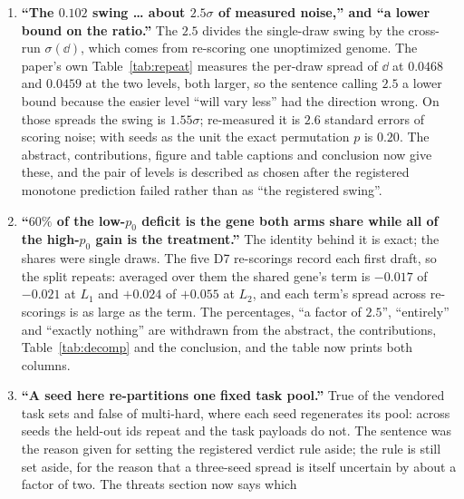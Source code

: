\documentclass[11pt]{article}
\begin{document}
\begin{enumerate}
    the critique gene and, in the quoted mechanism statement, the verifier gene for
    \texttt{ensure\_correct}, and the generation gene for \texttt{generate}. The companion on
    the silent no-op had already recorded this omission for the \texttt{actuator} and fixed it
    for that one gene; the class it belonged to was not swept, so four more names kept the same
    gap. The shared harness note now declares all of them, and a census fails on the next bare
    name nobody has ruled on.
  \item \textbf{``The $0.102$ swing \dots{} about $2.5\sigma$ of measured noise,'' and ``a lower
    bound on the ratio.''} The $2.5$ divides the single-draw swing by the cross-run $\sigma(\dd)$,
    which comes from re-scoring one unoptimized genome. The paper's own Table~\ref{tab:repeat}
    measures the per-draw spread of $\dd$ at $0.0468$ and $0.0459$ at the two levels, both larger,
    so the sentence calling $2.5$ a lower bound because the easier level ``will vary less'' had the
    direction wrong. On those spreads the swing is $1.55\sigma$; re-measured it is $2.6$ standard
    errors of scoring noise; with seeds as the unit the exact permutation $p$ is $0.20$. The
    abstract, contributions, figure and table captions and conclusion now give these, and the pair
    of levels is described as chosen after the registered monotone prediction failed rather than
    as ``the registered swing''.
  \item \textbf{``$60\%$ of the low-$p_0$ deficit is the gene both arms share while all of the
    high-$p_0$ gain is the treatment.''} The identity behind it is exact; the shares were single
    draws. The five D7 re-scorings record each first draft, so the split repeats: averaged over
    them the shared gene's term is $-0.017$ of $-0.021$ at $L_1$ and $+0.024$ of $+0.055$ at $L_2$,
    and each term's spread across re-scorings is as large as the term. The percentages, ``a factor
    of $2.5$'', ``entirely'' and ``exactly nothing'' are withdrawn from the abstract, the
    contributions, Table~\ref{tab:decomp} and the conclusion, and the table now prints both columns.
  \item \textbf{``A seed here re-partitions one fixed task pool.''} True of the vendored task
    sets and false of multi-hard, where each seed regenerates its pool: across seeds the held-out
    ids repeat and the task payloads do not. The sentence was the reason given for setting the
    registered verdict rule aside; the rule is still set aside, for the reason that a three-seed
    spread is itself uncertain by about a factor of two. The threats section now says which

\end{enumerate}
\end{document}
